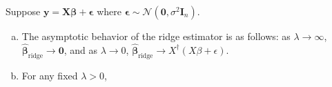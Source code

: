 
\begin{proposition}\label{linreg.dso.607.hw2} Suppose \(\boldsymbol{y} = \boldsymbol{X}\boldsymbol{\beta} + \boldsymbol{\epsilon}\) where \(\boldsymbol{\epsilon} \sim \mathcal{N}(\boldsymbol{0}, \sigma^2 \boldsymbol{I}_n)\).

\begin{enumerate}[(a)]

\item The asymptotic behavior of the ridge estimator is as follows: as \(\lambda \to \infty\), \(\hat{\boldsymbol{\beta}}_{\text{ridge}} \to \boldsymbol{0} \), and as \(\lambda \to 0\), \(\hat{\boldsymbol{\beta}}_{\text{ridge}} \to X^{\dagger}(X \beta + \epsilon)\).

\item For any fixed \(\lambda > 0\), 

\end{enumerate}

\end{proposition}


